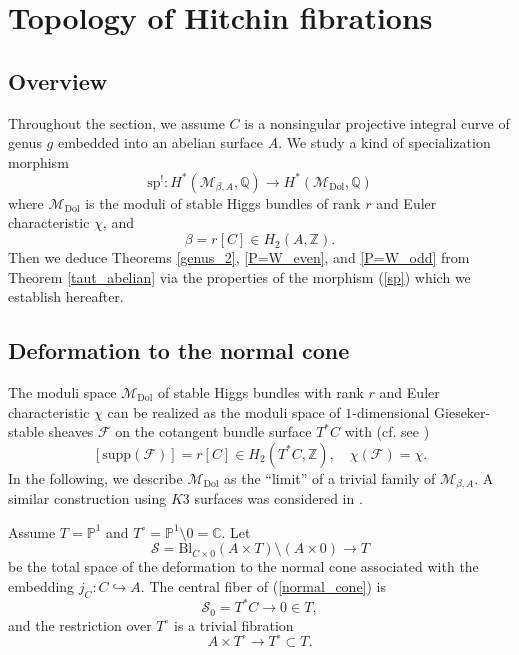 \documentclass[11pt]{amsart}
\theoremstyle{plain}
\theoremstyle{definition}
\theoremstyle{remark}
\newcommand{\BC}{{\mathbb{C}}}
\newcommand{\BP}{{\mathbb{P}}}
\newcommand{\BQ}{{\mathbb{Q}}}
\newcommand{\BZ}{{\mathbb{Z}}}
\newcommand{\CF}{{\mathcal F}}
\newcommand{\CM}{{\mathcal M}}
\newcommand{\CS}{{\mathcal S}}
\begin{document}
\section{Topology of Hitchin fibrations}\label{se4}

\subsection{Overview} Throughout the section, we assume $C$ is a nonsingular projective integral curve of genus $g$ embedded into an abelian surface $A$. We study {a kind of} specialization morphism
\begin{equation}\label{sp}
    \mathrm{sp}^!: H^*(\CM_{\beta, A}, \BQ) \to H^*(\CM_{\mathrm{Dol}}, \BQ)
\end{equation}
where $\CM_{\mathrm{Dol}}$ is the moduli of stable Higgs bundles of rank $r$ and Euler characteristic $\chi$, and 
\[
\beta = r[C] \in H_2(A, \BZ).
\]
Then we deduce Theorems \ref{genus_2}, \ref{P=W_even}, and \ref{P=W_odd} from Theorem \ref{taut_abelian} via the properties of the  morphism (\ref{sp}) which we establish hereafter.

\subsection{Deformation to the normal cone}\label{Section 4.2}

The moduli space $\CM_{\mathrm{Dol}}$ of stable Higgs bundles with rank $r$ and Euler characteristic $\chi$ can be realized as the moduli space of $1$-dimensional Gieseker-stable sheaves $\CF$ on the cotangent bundle  surface $T^*C$ with (cf. see \cite{BNR})
\[
 [\mathrm{supp}(\CF)] = r[C] \in H_2(T^*C, \BZ), \quad \chi(\CF) = \chi.
\]
In the following, we describe $\CM_{\mathrm{Dol}}$ as the ``limit'' of a trivial family of $\CM_{\beta,A}$. A similar construction using $K3$ surfaces was considered in \cite{DLL}.

Assume $T = \BP^1$ and $T^\circ = \BP^1 \setminus 0 = \BC$. Let 
\begin{equation}\label{normal_cone}
 \CS = \mathrm{Bl}_{C\times 0}(A \times T) \setminus (A\times 0) \to T
\end{equation}
be the total space of the deformation to the normal cone associated with the embedding $j_C:C\hookrightarrow A$. The central fiber of (\ref{normal_cone}) is
\[
\CS_0 = T^*C \to 0 \in T,
\]
and the restriction over $T^\circ$ is a trivial fibration
\[
A \times T^\circ \to  T^\circ \subset T.
\]
\end{document}
